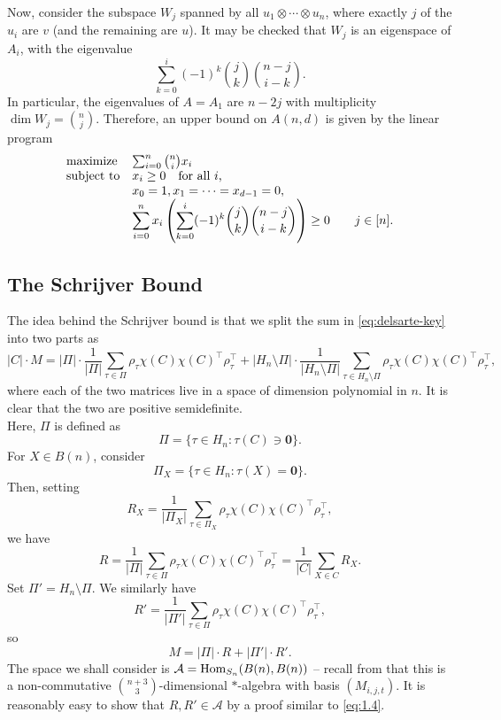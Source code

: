 	Now, consider the subspace $W_j$ spanned by all $u_1 \otimes \cdots \otimes u_n$, where exactly $j$ of the $u_i$ are $v$ (and the remaining are $u$). It may be checked that $W_j$ is an eigenspace of $A_i$, with the eigenvalue
	\[ \sum_{k=0}^{i} (-1)^k \binom{j}{k} \binom{n-j}{i-k}. \]
	In particular, the eigenvalues of $A = A_1$ are $n-2j$ with multiplicity $\dim W_j = \binom{n}{j}$. Therefore, an upper bound on $A(n,d)$ is given by the linear program
	\[
		\label{indep-sdp3}
		\begin{array}{ll@{}ll}
		\text{maximize}  & \sum_{i=0}^{n} \binom{n}{i} x_i  &\\
		\text{subject to} \displaystyle & x_i \ge 0 \quad \text{for all $i$,} &\\
		& x_0 = 1, x_1 = \cdots = x_{d-1} = 0, & \\
		& \displaystyle \sum_{i=0}^{n} x_i \left( \sum_{k=0}^{i} (-1)^k \binom{j}{k} \binom{n-j}{i-k} \right) \ge 0 & \qquad j \in [n].
		\end{array}
	\]

\subsection{The Schrijver Bound}

	The idea behind the Schrijver bound is that we split the sum in \cref{eq:delsarte-key} into two parts as 
	\[ |C| \cdot M = |\Pi| \cdot \frac{1}{|\Pi|} \sum_{\tau \in \Pi} \rho_\tau \chi(C) \chi(C)^\top \rho_\tau^\top + |H_n \setminus \Pi| \cdot \frac{1}{|H_n \setminus \Pi|} \sum_{\tau \in H_n \setminus \Pi} \rho_\tau \chi(C) \chi(C)^\top \rho_\tau^\top, \]
	where each of the two matrices live in a space of dimension polynomial in $n$. It is clear that the two are positive semidefinite.\\
	Here, $\Pi$ is defined as
	\[ \Pi = \{ \tau \in H_n : \tau(C) \ni \mathbf{0} \}. \]
	For $X \in B(n)$, consider
	\[ \Pi_X = \{ \tau \in H_n : \tau(X) = \mathbf{0} \}. \]
	Then, setting 
	\[ R_X = \frac{1}{|\Pi_X|} \sum_{\tau \in \Pi_X} \rho_{\tau} \chi(C) \chi(C)^\top \rho_\tau^\top, \]
	we have
	\[ R = \frac{1}{|\Pi|} \sum_{\tau \in \Pi} \rho_{\tau} \chi(C) \chi(C)^\top \rho_\tau^\top = \frac{1}{|C|} \sum_{X \in C} R_X. \]
	Set $\Pi' = H_n \setminus \Pi$. We similarly have
	\[ R' = \frac{1}{|\Pi'|} \sum_{\tau \in \Pi} \rho_{\tau} \chi(C) \chi(C)^\top \rho_\tau^\top, \]
	so
	\[ M = |\Pi| \cdot R + |\Pi'| \cdot R'. \]
	The space we shall consider is $\mathcal{A} = \operatorname{Hom}_{S_n}(B(n),B(n))$ -- recall from  that this is a non-commutative $\binom{n+3}{3}$-dimensional $*$-algebra with basis $(M_{i,j,t})$. It is reasonably easy to show that $R,R' \in \mathcal{A}$ by a proof similar to \cref{eq:1.4}.

